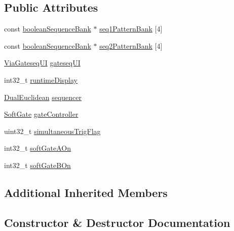 \subsection*{Public Attributes}
\begin{DoxyCompactItemize}
\item 
const \mbox{\hyperlink{structboolean_sequence_bank}{boolean\+Sequence\+Bank}} $\ast$ \mbox{\hyperlink{class_via_gateseq_ad505b120d66ea6e9beb846d66a8021fa}{seq1\+Pattern\+Bank}} \mbox{[}4\mbox{]}
\item 
const \mbox{\hyperlink{structboolean_sequence_bank}{boolean\+Sequence\+Bank}} $\ast$ \mbox{\hyperlink{class_via_gateseq_a1faa904a07ea274aeff80dbb18f8518c}{seq2\+Pattern\+Bank}} \mbox{[}4\mbox{]}
\item 
\mbox{\hyperlink{class_via_gateseq_1_1_via_gateseq_u_i}{Via\+Gateseq\+UI}} \mbox{\hyperlink{class_via_gateseq_ae55cb2ce39ea0d6d614cd43f287f1151}{gateseq\+UI}}
\item 
int32\+\_\+t \mbox{\hyperlink{class_via_gateseq_a6234f09e46a196927229d2bd7e0c2ea0}{runtime\+Display}}
\item 
\mbox{\hyperlink{class_dual_euclidean}{Dual\+Euclidean}} \mbox{\hyperlink{class_via_gateseq_aade5918995b92e3f1fd8a3b07e0bd7f4}{sequencer}}
\item 
\mbox{\hyperlink{class_soft_gate}{Soft\+Gate}} \mbox{\hyperlink{class_via_gateseq_a07aca8cb788a3452736e585b82fd6826}{gate\+Controller}}
\item 
uint32\+\_\+t \mbox{\hyperlink{class_via_gateseq_ab15d726ba5d302f110c2fa9b516aac45}{simultaneous\+Trig\+Flag}}
\item 
int32\+\_\+t \mbox{\hyperlink{class_via_gateseq_a08cc58f74037e3c3b1218a9f94126faa}{soft\+Gate\+A\+On}}
\item 
int32\+\_\+t \mbox{\hyperlink{class_via_gateseq_a8be6a729cb7703bd94de42cb59a17241}{soft\+Gate\+B\+On}}
\end{DoxyCompactItemize}
\subsection*{Additional Inherited Members}


\subsection{Constructor \& Destructor Documentation}
\mbox{\label{class_via_gateseq_ac0bb7455cf2081d645574d5274862591}} 
